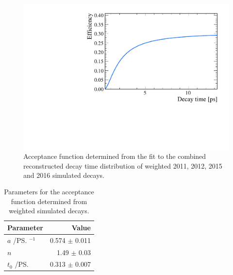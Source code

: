 \begin{figure}[tbp]
    \centering
        \includegraphics[width= 0.6 \textwidth]{./Figs/LifetimeMeasurement/Bs2MuMu_Acceptance_plot_no_points.pdf}

    \caption{Acceptance function determined from the fit to the combined reconstructed decay time distribution of weighted 2011, 2012, 2015 and 2016 simulated \bsmumu decays.} %
    \label{fig:accptplot}
\end{figure}


\begin{table}[tbp]
\begin{center}
\begin{tabular}{lr}
\toprule \toprule
Parameter & Value \\
\midrule
$a$ /\ps$^{-1}$ & 0.574 $\pm$ 0.011\\
$n$ & 1.49 $\pm$ 0.03 \\
$t_{0}$ /\ps &  0.313 $\pm$ 0.007 \\

\bottomrule \bottomrule
\end{tabular}
\vspace{0.7cm}             
\caption{Parameters for the \bsmumu acceptance function determined from weighted simulated \bsmumu decays.}
\label{tab:accptsig}
\end{center}
\vspace{-1.0cm}                                                                                                                                               
\end{table}

